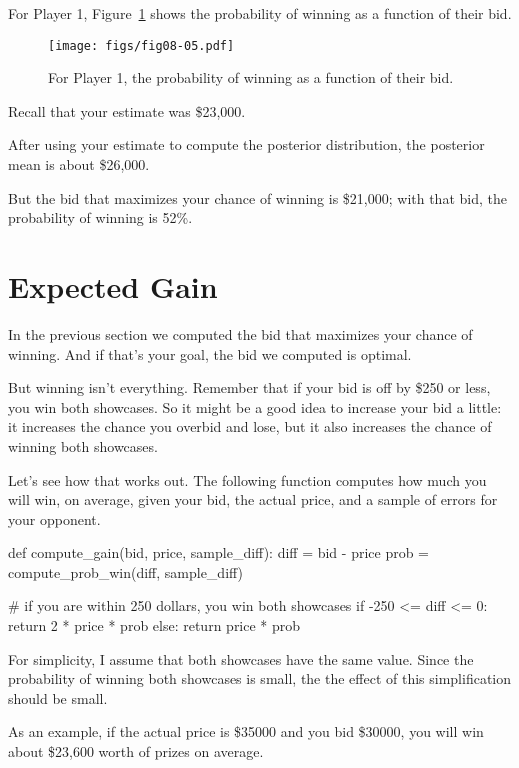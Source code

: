 \documentclass[12pt]{book}
\theoremstyle{exercise}
\begin{document}
For Player 1, Figure~\ref{fig08-05} shows the probability of winning as a function of their bid.

\begin{figure}
\centerline{\texttt{[image: figs/fig08-05.pdf]}}
\caption{For Player 1, the probability of winning as a function of their bid.}
\label{fig08-05}
\end{figure}

Recall that your estimate was \$23,000.

After using your estimate to compute the posterior distribution, the posterior mean is about \$26,000.

But the bid that maximizes your chance of winning is \$21,000; with that bid, the probability of winning is 52\%.


\section{Expected Gain}

In the previous section we computed the bid that maximizes your chance of winning.
And if that's your goal, the bid we computed is optimal.

But winning isn't everything.
Remember that if your bid is off by \$250 or less, you win both showcases.
So it might be a good idea to increase your bid a little: it increases the chance you overbid and lose, but it also increases the chance of winning both showcases.

Let's see how that works out.
The following function computes how much you will win, on average, given your bid, the actual price, and a sample of errors for your opponent.

\begin{code}
def compute_gain(bid, price, sample_diff):
    diff = bid - price
    prob = compute_prob_win(diff, sample_diff)

    # if you are within 250 dollars, you win both showcases
    if -250 <= diff <= 0:
        return 2 * price * prob
    else:
        return price * prob
\end{code}

For simplicity, I assume that both showcases have the same value.
Since the probability of winning both showcases is small, the the effect of this simplification should be small.

As an example, if the actual price is \$35000
and you bid \$30000,
you will win about \$23,600 worth of prizes on average.
\end{document}
